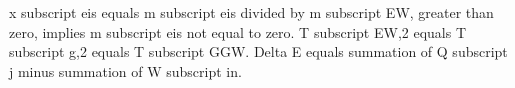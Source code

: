 x subscript eis equals m subscript eis divided by m subscript EW, greater than zero, implies m subscript eis not equal to zero.  
T subscript EW,2 equals T subscript g,2 equals T subscript GGW.  
Delta E equals summation of Q subscript j minus summation of W subscript in.